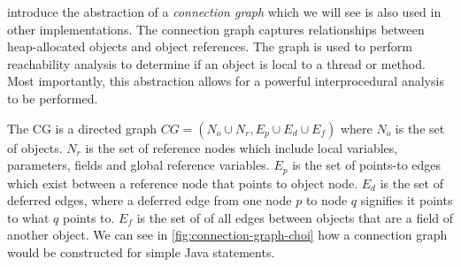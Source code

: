 \documentclass{proposal}
\begin{document}
    \citet{Choi1999} introduce the abstraction of a \emph{connection graph} which we will see is also used in other implementations.
    The connection graph captures relationships between heap-allocated objects and object references.
    The graph is used to perform reachability analysis to determine if an object is local to a thread or method.
    Most importantly, this abstraction allows for a powerful interprocedural analysis to be performed.

    The CG is a directed graph $CG = (N_{o} \cup N_{r}, E_{p} \cup E_{d} \cup E_{f})$ where $N_{o}$ is the set of objects.
    $N_{r}$ is the set of reference nodes which include local variables, parameters, fields and global reference variables.
    $E_{p}$ is the set of points-to edges which exist between a reference node that points to object node.
    $E_{d}$ is the set of deferred edges, where a deferred edge from one node $p$ to node $q$ signifies it points to what $q$ points to.
    $E_{f}$ is the set of of all edges between objects that are a field of another object.
    We can see in \autoref{fig:connection-graph-choi} how a connection graph would be constructed for simple Java statements.
\end{document}
